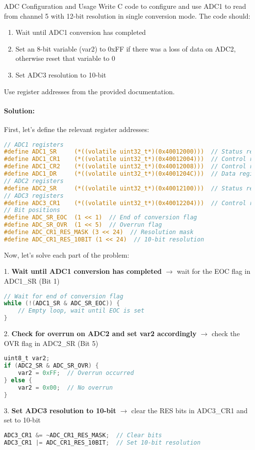 \begin{example2}{ADC Configuration and Usage}
Write C code to configure and use ADC1 to read from channel 5 with 12-bit resolution in single conversion mode. The code should:

\begin{enumerate}
    \item Wait until ADC1 conversion has completed
    \item Set an 8-bit variable (var2) to 0xFF if there was a loss of data on ADC2, otherwise reset that variable to 0
    \item Set ADC3 resolution to 10-bit
\end{enumerate}

Use register addresses from the provided documentation.

\paragraph{Solution:}
First, let's define the relevant register addresses:
\begin{lstlisting}[language=C, style=basesmol]
// ADC1 registers
#define ADC1_SR     (*((volatile uint32_t*)(0x40012000)))  // Status register
#define ADC1_CR1    (*((volatile uint32_t*)(0x40012004)))  // Control register 1
#define ADC1_CR2    (*((volatile uint32_t*)(0x40012008)))  // Control register 2
#define ADC1_DR     (*((volatile uint32_t*)(0x4001204C)))  // Data register
// ADC2 registers
#define ADC2_SR     (*((volatile uint32_t*)(0x40012100)))  // Status register
// ADC3 registers
#define ADC3_CR1    (*((volatile uint32_t*)(0x40012204)))  // Control register 1
// Bit positions
#define ADC_SR_EOC  (1 << 1)  // End of conversion flag
#define ADC_SR_OVR  (1 << 5)  // Overrun flag
#define ADC_CR1_RES_MASK (3 << 24)  // Resolution mask
#define ADC_CR1_RES_10BIT (1 << 24)  // 10-bit resolution
\end{lstlisting}

Now, let's solve each part of the problem:

1. \textbf{Wait until ADC1 conversion has completed} $\rightarrow$ wait for the EOC flag in ADC1\_SR (Bit 1)
\begin{lstlisting}[language=C, style=basesmol]
// Wait for end of conversion flag
while (!(ADC1_SR & ADC_SR_EOC)) {
    // Empty loop, wait until EOC is set
}
\end{lstlisting}

2. \textbf{Check for overrun on ADC2 and set var2 accordingly} $\rightarrow$ check the OVR flag in ADC2\_SR (Bit 5)
\begin{lstlisting}[language=C, style=basesmol]
uint8_t var2;
if (ADC2_SR & ADC_SR_OVR) {
    var2 = 0xFF;  // Overrun occurred
} else {
    var2 = 0x00;  // No overrun
}
\end{lstlisting}

3. \textbf{Set ADC3 resolution to 10-bit} $\rightarrow$ clear the RES bits in ADC3\_CR1 and set to 10-bit
\begin{lstlisting}[language=C, style=basesmol]
ADC3_CR1 &= ~ADC_CR1_RES_MASK;  // Clear bits
ADC3_CR1 |= ADC_CR1_RES_10BIT;  // Set 10-bit resolution
\end{lstlisting}
\end{example2}


